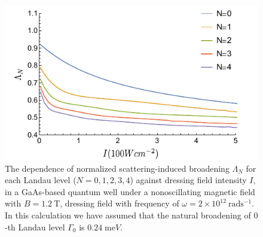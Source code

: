 \begin{figure}[b]
\includegraphics[scale=0.68]{figures/fig_4}
\caption{\label{fig_4} The dependence of normalized scattering-induced broadening $\Lambda_N$ for each Landau level ($N =0,1,2,3,4$) against dressing field intensity $I$, in a GaAs-based quantum well under a nonoscillating magnetic field with $B = 1.2~\text{T}$, dressing field with frequency of $\omega =2\times10^{12}~\text{rad}\text{s}^{-1}$. In this calculation we have assumed that the natural broadening of $0$-th Landau level $\Gamma_0$ is $0.24\;\text{me}V$.}
\end{figure}

